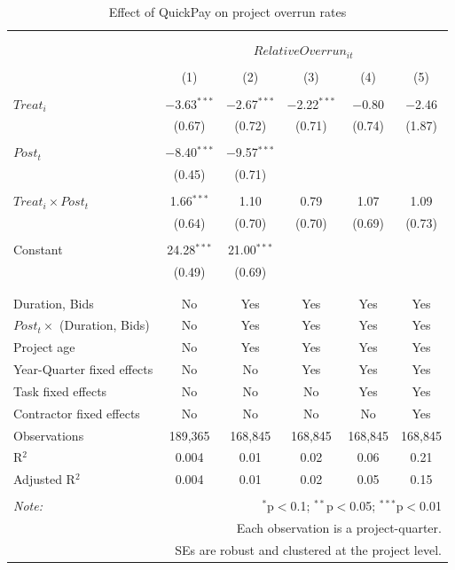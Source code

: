 \documentclass[
]{article}
\begin{document}
\begin{table}[H] \centering 
  \caption{Effect of QuickPay on project overrun rates} 
  \label{} 
\small 
\begin{tabular}{@{\extracolsep{-2pt}}lccccc} 
\\[-1.8ex]\hline 
\hline \\[-1.8ex] 
\\[-1.8ex] & \multicolumn{5}{c}{$RelativeOverrun_{it}$} \\ 
\\[-1.8ex] & (1) & (2) & (3) & (4) & (5)\\ 
\hline \\[-1.8ex] 
 $Treat_i$ & $-$3.63$^{***}$ & $-$2.67$^{***}$ & $-$2.22$^{***}$ & $-$0.80 & $-$2.46 \\ 
  & (0.67) & (0.72) & (0.71) & (0.74) & (1.87) \\ 
  & & & & & \\ 
 $Post_t$ & $-$8.40$^{***}$ & $-$9.57$^{***}$ &  &  &  \\ 
  & (0.45) & (0.71) &  &  &  \\ 
  & & & & & \\ 
 $Treat_i \times Post_t$ & 1.66$^{***}$ & 1.10 & 0.79 & 1.07 & 1.09 \\ 
  & (0.64) & (0.70) & (0.70) & (0.69) & (0.73) \\ 
  & & & & & \\ 
 Constant & 24.28$^{***}$ & 21.00$^{***}$ &  &  &  \\ 
  & (0.49) & (0.69) &  &  &  \\ 
  & & & & & \\ 
\hline \\[-1.8ex] 
Duration, Bids & No & Yes & Yes & Yes & Yes \\ 
$Post_t \times$  (Duration, Bids) & No & Yes & Yes & Yes & Yes \\ 
Project age & No & Yes & Yes & Yes & Yes \\ 
Year-Quarter fixed effects & No & No & Yes & Yes & Yes \\ 
Task fixed effects & No & No & No & Yes & Yes \\ 
Contractor fixed effects & No & No & No & No & Yes \\ 
Observations & 189,365 & 168,845 & 168,845 & 168,845 & 168,845 \\ 
R$^{2}$ & 0.004 & 0.01 & 0.02 & 0.06 & 0.21 \\ 
Adjusted R$^{2}$ & 0.004 & 0.01 & 0.02 & 0.05 & 0.15 \\ 
\hline 
\hline \\[-1.8ex] 
\textit{Note:}  & \multicolumn{5}{r}{$^{*}$p$<$0.1; $^{**}$p$<$0.05; $^{***}$p$<$0.01} \\ 
 & \multicolumn{5}{r}{Each observation is a project-quarter.} \\ 
 & \multicolumn{5}{r}{SEs are robust and clustered at the project level.} \\ 
\end{tabular} 
\end{table}
\end{document}

